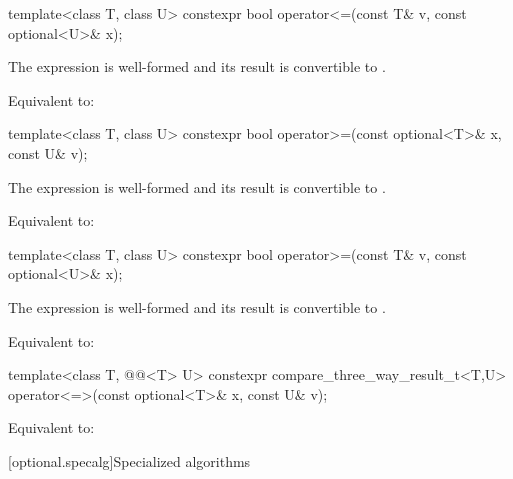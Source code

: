 %
\begin{itemdecl}
template<class T, class U> constexpr bool operator<=(const T& v, const optional<U>& x);
\end{itemdecl}

\begin{itemdescr}
\pnum
\mandates
The expression  is well-formed and
its result is convertible to .

\pnum
\effects
Equivalent to: 
\end{itemdescr}

%
\begin{itemdecl}
template<class T, class U> constexpr bool operator>=(const optional<T>& x, const U& v);
\end{itemdecl}

\begin{itemdescr}
\pnum
\mandates
The expression  is well-formed and
its result is convertible to .

\pnum
\effects
Equivalent to: 
\end{itemdescr}

%
\begin{itemdecl}
template<class T, class U> constexpr bool operator>=(const T& v, const optional<U>& x);
\end{itemdecl}

\begin{itemdescr}
\pnum
\mandates
The expression  is well-formed and
its result is convertible to .

\pnum
\effects
Equivalent to: 
\end{itemdescr}

%
\begin{itemdecl}
template<class T, @@<T> U>
  constexpr compare_three_way_result_t<T,U>
    operator<=>(const optional<T>& x, const U& v);
\end{itemdecl}

\begin{itemdescr}
\pnum
\effects
Equivalent to: 
\end{itemdescr}

[optional.specalg]{Specialized algorithms}

